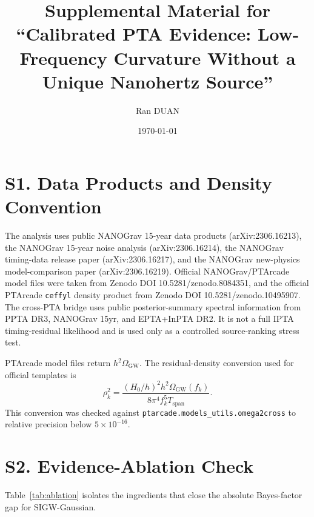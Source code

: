 \documentclass[aps,prl,superscriptaddress,nofootinbib]{revtex4-2}
\begin{document}
\title{Supplemental Material for ``Calibrated PTA Evidence: Low-Frequency Curvature Without a Unique Nanohertz Source''}

\author{Ran DUAN}
\date{\today}

\maketitle

\section*{S1. Data Products and Density Convention}

The analysis uses public NANOGrav 15-year data products
(arXiv:2306.16213), the NANOGrav 15-year noise analysis
(arXiv:2306.16214), the NANOGrav timing-data release paper
(arXiv:2306.16217), and the NANOGrav new-physics model-comparison paper
(arXiv:2306.16219).  Official NANOGrav/PTArcade model files were taken
from Zenodo DOI 10.5281/zenodo.8084351, and the official PTArcade
\texttt{ceffyl} density product from Zenodo DOI 10.5281/zenodo.10495907.
The cross-PTA bridge uses public posterior-summary spectral information
from PPTA DR3, NANOGrav 15yr, and EPTA+InPTA DR2.  It is not a full IPTA
timing-residual likelihood and is used only as a controlled
source-ranking stress test.

PTArcade model files return $h^2\Omega_\mathrm{GW}$.  The residual-density
conversion used for official templates is
\begin{equation}
\rho_k^2 =
\frac{(H_0/h)^2 h^2\Omega_\mathrm{GW}(f_k)}
{8\pi^4 f_k^5 T_\mathrm{span}} .
\end{equation}
This conversion was checked against \nolinkurl{ptarcade.models_utils.omega2cross}
to relative precision below $5\times10^{-16}$.

\section*{S2. Evidence-Ablation Check}

Table~\ref{tab:ablation} isolates the ingredients that close the absolute
Bayes-factor gap for SIGW-Gaussian.
\end{document}

